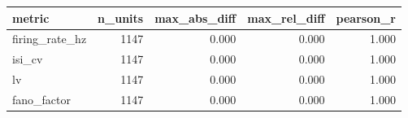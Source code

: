 \begin{tabular}{lrrrr}
\toprule
metric & n_units & max_abs_diff & max_rel_diff & pearson_r \\
\midrule
firing_rate_hz & 1147 & 0.000 & 0.000 & 1.000 \\
isi_cv & 1147 & 0.000 & 0.000 & 1.000 \\
lv & 1147 & 0.000 & 0.000 & 1.000 \\
fano_factor & 1147 & 0.000 & 0.000 & 1.000 \\
\bottomrule
\end{tabular}
